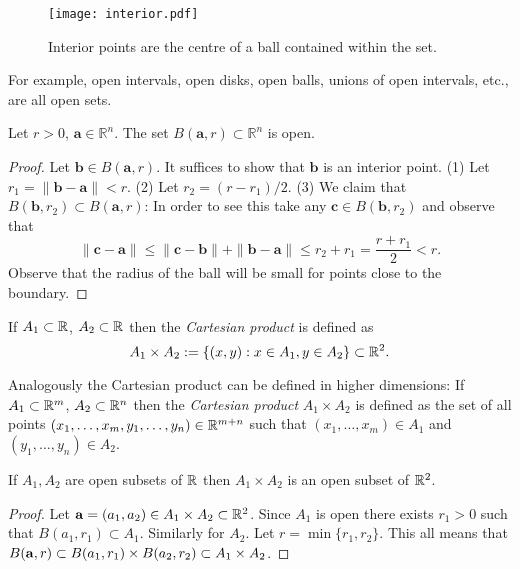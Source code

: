 \begin{figure}[htbp]
    \begin{center}
        \texttt{[image: interior.pdf]}
        \caption{Interior points are the centre of a ball contained within the set.}
    \end{center}
\end{figure}


For example,
open intervals, open disks, open balls, unions of open intervals, etc., are all open sets.

\begin{lemma*}
    Let \(r>0\), \(\mathbf{a} \in \mathbb{R}^n\). The set \(B(\mathbf{a},r) \subset \mathbb{R}^n\) is open.
\end{lemma*}
\begin{proof}
    Let \(\mathbf{b} \in B(\mathbf{a},r)\). It suffices to show that \(\mathbf{b}\) is an interior point.
    (1) Let \(r_1 = \| \mathbf{b} - \mathbf{a} \| < r\).
    (2) Let \(r_2 = (r - r_1)/2\).
    (3) We claim that \(B(\mathbf{b},r_2) \subset B(\mathbf{a},r)\):
    In order to see this take any \(\mathbf{c} \in B(\mathbf{b},r_2)\) and observe that
    \[
        \| \mathbf{c} - \mathbf{a} \| \leq \| \mathbf{c} - \mathbf{b} \|  + \| \mathbf{b} - \mathbf{a} \| \leq r_2 + r_1 = \frac{r + r_1}{2} < r.
    \]
    Observe that the radius of the ball will be small for points close to the boundary.
\end{proof}



\begin{definition}
    If \(A_1 \subset \bR\), \(A_2 \subset \bR\) then the \emph{Cartesian product} is defined as
    \[
        A_1 \times A_2 := \left\{(x,y): x \in A_1, y \in A_2\right\}
        \subset \bR^{2}.
    \]
\end{definition}

Analogously the Cartesian product can be defined in higher dimensions:
If \(A_1 \subset \bR^m\), \(A_2 \subset \bR^n\) then the \emph{Cartesian product} \(A_1 \times A_2\) is defined as the set of all points \((x_1,\ldots,x_m,y_1,\ldots,y_n) \in \bR^{m+n}\) such that \((x_1,\ldots,x_m) \in A_1\) and \((y_1,\ldots,y_n) \in A_2\).


\begin{lemma*}
    If \(A_1, A_2\) are open subsets of \(\bR\) then \( A_1 \times A_2 \) is an open subset of \(\bR^2\).
\end{lemma*}
\begin{proof}
    Let \(\aa = (a_1,a_2) \in A_1\times A_2 \subset \bR^2\).
    Since  \(A_1\) is open there  exists \(r_1>0\) such that \(B(a_1,r_1)\subset A_1\).
    Similarly for \(A_2\).
    Let \(r=\min \{r_1,r_2\}\).
    This all means that \(B(\aa,r) \subset B(a_1,r_1) \times B(a_2,r_2) \subset A_1\times A_2\).
\end{proof}


